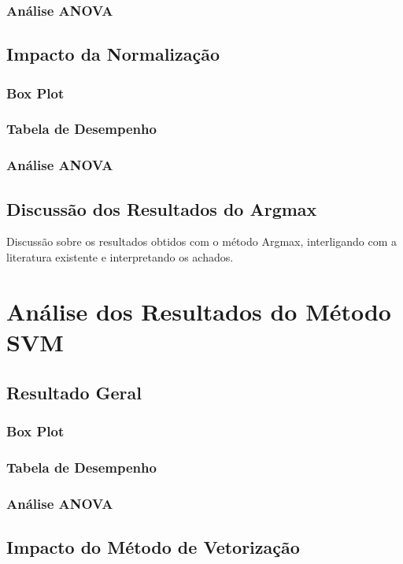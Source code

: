 \subsubsection{Análise ANOVA}

\subsection{Impacto da Normalização}
\subsubsection{Box Plot}
\subsubsection{Tabela de Desempenho}
\subsubsection{Análise ANOVA}

\subsection{Discussão dos Resultados do Argmax}
Discussão sobre os resultados obtidos com o método Argmax, interligando com a literatura existente e interpretando os achados.

\section{Análise dos Resultados do Método SVM}
\subsection{Resultado Geral}
\subsubsection{Box Plot}
\subsubsection{Tabela de Desempenho}
\subsubsection{Análise ANOVA}

\subsection{Impacto do Método de Vetorização}
